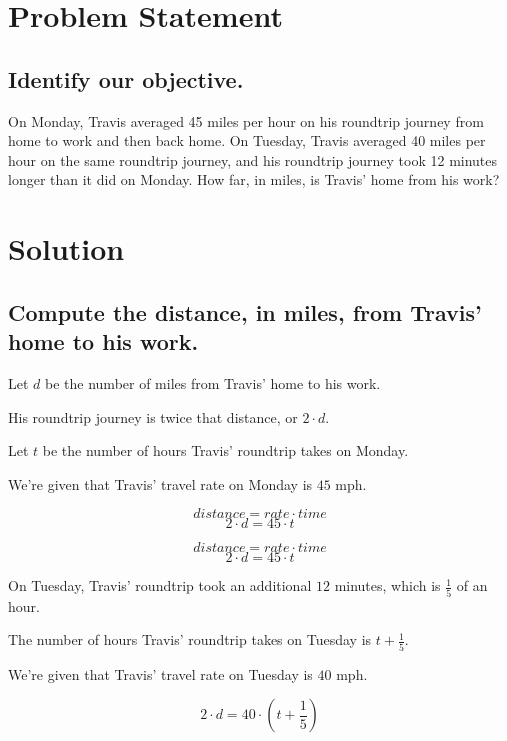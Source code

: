 \documentclass{beamer} %
\begin{document}
\begin{frame} %
  \titlepage
\end{frame}

\section{Problem Statement}

\subsection*{Identify our objective.}

\begin{frame}
  On Monday, Travis averaged 45 miles per hour on his roundtrip journey from home to work and then back home. On Tuesday, Travis averaged 40 miles per hour on the same roundtrip journey, and his roundtrip journey took 12 minutes longer than it did on Monday. How far, in miles, is Travis' home from his work?
\end{frame}

\section{Solution}

\subsection*{Compute the distance, in miles, from Travis' home to his work.}

\begin{frame}
Let $d$ be the number of miles from Travis' home to his work. \pause

His roundtrip journey is twice that distance, or $2\cdot d$. \pause

Let $t$ be the number of hours Travis' roundtrip takes on Monday. \pause

We're given that Travis' travel rate on Monday is $45$ mph.\pause

\[
distance = rate \cdot time
\]
\begin{equation}
2\cdot d = 45\cdot t
\end{equation}
\end{frame}

\setcounter{equation}{0}

\begin{frame}
\[
distance = rate \cdot time
\]
\begin{equation}
2\cdot d = 45\cdot t
\end{equation}

\pause On Tuesday, Travis' roundtrip took an additional $12$ minutes, which is $\frac{1}{5}$ of an hour. \pause

The number of hours Travis' roundtrip takes on Tuesday is $t + \frac{1}{5}$. \pause

We're given that Travis' travel rate on Tuesday is $40$ mph.\pause

\begin{equation}
2\cdot d = 40\cdot \left( t + \frac{1}{5} \right)
\end{equation}
\end{frame}
\end{document}
